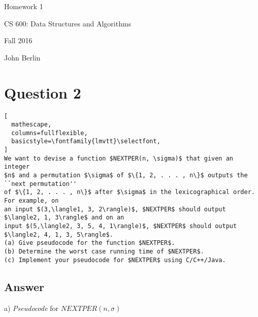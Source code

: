 \documentclass{article}
\begin{document}
\begin{titlepage}

\begin{center}

\Huge{Homework 1}

\Large{CS 600:  Data Structures and Algorithms }

\Large{Fall 2016}

\Large{John Berlin}



\end{center}

\end{titlepage}
\section*{Question 2}
\begin{lstlisting}[
  mathescape,
  columns=fullflexible,
  basicstyle=\fontfamily{lmvtt}\selectfont,
]
We want to devise a function $NEXTPER(n, \sigma)$ that given an integer
$n$ and a permutation $\sigma$ of $\{1, 2, . . . , n\}$ outputs the ``next permutation''
of $\{1, 2, . . . , n\}$ after $\sigma$ in the lexicographical order. For example, on
an input $(3,\langle1, 3, 2\rangle)$, $NEXTPER$ should output $\langle2, 1, 3\rangle$ and on an
input $(5,\langle2, 3, 5, 4, 1\rangle)$, $NEXTPER$ should output $\langle2, 4, 1, 3, 5\rangle$.
(a) Give pseudocode for the function $NEXTPER$.
(b) Determine the worst case running time of $NEXTPER$.
(c) Implement your pseudocode for $NEXTPER$ using C/C++/Java.
\end{lstlisting}
\subsection*{Answer}
a) 
\textit{Pseudocode} for $NEXTPER(n, \sigma)$
\end{document}
